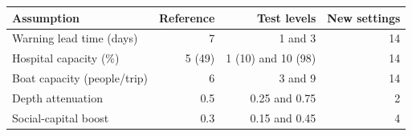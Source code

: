 \begin{tabular}{lrrr}
\toprule
Assumption & Reference & Test levels & New settings \\
\midrule
Warning lead time (days) & 7 & 1 and 3 & 14 \\
Hospital capacity (\%) & 5 (49) & 1 (10) and 10 (98) & 14 \\
Boat capacity (people/trip) & 6 & 3 and 9 & 14 \\
Depth attenuation & 0.5 & 0.25 and 0.75 & 2 \\
Social-capital boost & 0.3 & 0.15 and 0.45 & 4 \\
\bottomrule
\end{tabular}
